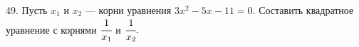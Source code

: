 49. Пусть $x_1$ и $x_2$ --- корни уравнения $3x^2-5x-11=0.$ Составить квадратное уравнение с корнями $\cfrac{1}{x_1}$ и $\cfrac{1}{x_2}.$\\
